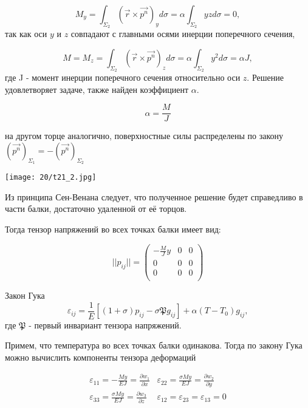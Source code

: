 $$ M_y = \int_{\Sigma_2} {(\vec{r} \times \vec{p^n})_y d{\sigma}} = \alpha \int_{\Sigma_2} {yz d{\sigma}} = 0,$$
\noindent так как оси $y$ и $z$ совпадают с главными осями инерции поперечного сечения,

$$ M = M_z = \int_{\Sigma_2} {(\vec{r} \times \vec{p^n})_z d{\sigma}} = \alpha \int_{\Sigma_2} {y^2 d{\sigma}} = \alpha J,$$
\noindent где J - момент инерции поперечного сечения относительно оси $z$. Решение удовлетворяет задаче, также найден коэффициент $\alpha$.

$$ \alpha = \frac{M}{J} $$

на другом торце аналогично, поверхностные силы распределены по закону $(\vec{p^n})_{\Sigma_1} = - (\vec{p^n})_{\Sigma_2}$

\texttt{[image: 20/t21\_2.jpg]}

Из принципа Сен-Венана следует, что полученное решение будет справедливо в части балки, достаточно удаленной от её торцов.

\noindent Тогда тензор напряжений во всех точках балки имеет вид:

\begin{equation*}
  ||p_{ij}|| = \left(
  \begin{array}{ccc}
      -\frac{M}{J}y & 0 & 0 \\
      0             & 0 & 0 \\
      0             & 0 & 0 \\
    \end{array}
  \right)
\end{equation*}

Закон Гука
$$ \varepsilon_{ij} = \frac{1}{E} \left[ (1+\sigma)p_{ij} - \sigma \mathfrak{P} g_{ij} \right] + \alpha (T-T_0)g_{ij} ,$$
где $\mathfrak{P}$ - первый инвариант тензора напряжений.

Примем, что температура во всех точках балки одинакова. Тогда по закону Гука можно вычислить компоненты тензора деформаций

\begin{equation}
  \begin{array}{cc}
    \varepsilon_{11} = -\frac{My}{EJ} = \frac{\partial w_1}{\partial x}       & \varepsilon_{22} = \frac{\sigma My}{EJ} = \frac{\partial w_2}{\partial y} \\
    \varepsilon_{33} = \frac{\sigma My}{EJ} = \frac{\partial w_3}{\partial z} & \varepsilon_{12} = \varepsilon_{23} = \varepsilon_{13} = 0
  \end{array}
\end{equation}

